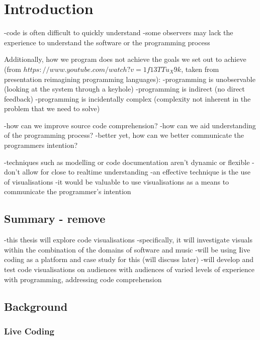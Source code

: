 
\chapter{Introduction}
\label{cha:intro}

-code is often difficult to quickly understand
-some observers may lack the experience to understand the software or the programming process

Additionally, how we program does not achieve the goals we set out to achieve (from $https://www.youtube.com/watch?v=1f13TTu_X9k$, taken from presentation reimagining programming languages):
-programming is unobservable (looking at the system through a keyhole)
-programming is indirect (no direct feedback)
-programming is incidentally complex (complexity not inherent in the problem that we need to solve)




-how can we improve source code comprehension?
-how can we aid understanding of the programming process?
-better yet, how can we better communicate the programmers intention?

-techniques such as modelling or code documentation aren’t dynamic or flexible
-don’t allow for close to realtime understanding
-an effective technique is the use of visualisations
-it would be valuable to use visualisations as a means to communicate the programmer’s intention


\section{Summary - remove}

-this thesis will explore code visualisations
-specifically, it will investigate visuals within the combination of the domains of software and music
-will be using Iive coding as a platform and case study for this (will discuss later)
-will develop and test code visualisations on audiences with audiences of varied levels of experience with programming, addressing code comprehension

\section{Background}
\label{sec:basis}


\subsection{Live Coding}

